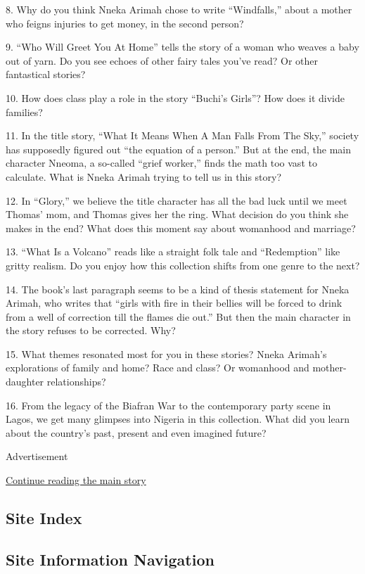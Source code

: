8. Why do you think Nneka Arimah chose to write ``Windfalls,'' about a
mother who feigns injuries to get money, in the second person?

9. ``Who Will Greet You At Home'' tells the story of a woman who weaves
a baby out of yarn. Do you see echoes of other fairy tales you've read?
Or other fantastical stories?

10. How does class play a role in the story ``Buchi's Girls''? How does
it divide families?

11. In the title story, ``What It Means When A Man Falls From The Sky,''
society has supposedly figured out ``the equation of a person.'' But at
the end, the main character Nneoma, a so-called ``grief worker,'' finds
the math too vast to calculate. What is Nneka Arimah trying to tell us
in this story?

12. In ``Glory,'' we believe the title character has all the bad luck
until we meet Thomas' mom, and Thomas gives her the ring. What decision
do you think she makes in the end? What does this moment say about
womanhood and marriage?

13. ``What Is a Volcano'' reads like a straight folk tale and
``Redemption'' like gritty realism. Do you enjoy how this collection
shifts from one genre to the next?

14. The book's last paragraph seems to be a kind of thesis statement for
Nneka Arimah, who writes that ``girls with fire in their bellies will be
forced to drink from a well of correction till the flames die out.'' But
then the main character in the story refuses to be corrected. Why?

15. What themes resonated most for you in these stories? Nneka Arimah's
explorations of family and home? Race and class? Or womanhood and
mother-daughter relationships?

16. From the legacy of the Biafran War to the contemporary party scene
in Lagos, we get many glimpses into Nigeria in this collection. What did
you learn about the country's past, present and even imagined future?

Advertisement

\protect\hyperlink{after-bottom}{Continue reading the main story}

\hypertarget{site-index}{%
\subsection{Site Index}\label{site-index}}

\hypertarget{site-information-navigation}{%
\subsection{Site Information
Navigation}\label{site-information-navigation}}


